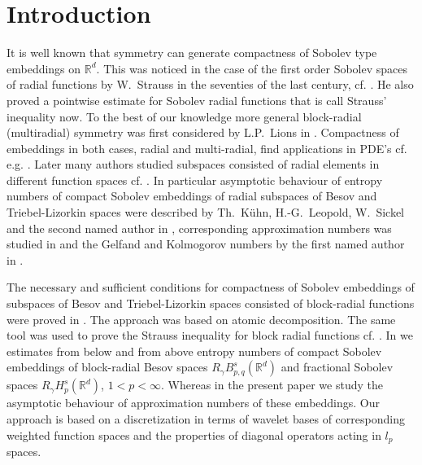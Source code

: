 \documentclass[12pt]{article}
\newcommand{\R}{{\mathbb R}}
\begin{document}
\section{Introduction}
 It is well known that symmetry  can generate compactness of Sobolev type embeddings on $\R^d$.    This  was noticed  in the case of the  first order Sobolev spaces of radial functions by W.~Strauss in  the seventies of the last century, cf. \cite{Strauss}. He also  proved  a pointwise estimate for  Sobolev radial functions that is call  Strauss' inequality now.  To the best of our knowledge  more general block-radial (multiradial) symmetry was first considered by L.P.~Lions in \cite{Lio82}. Compactness of embeddings in  both cases, radial and multi-radial, find applications in PDE's cf. e.g.   \cite{APS,Ku,PK,Serra}. 
  Later  many authors studied subspaces consisted of radial elements in different function spaces cf. \cite{EF1, SS1, SSV, SYY}. In particular asymptotic behaviour of entropy numbers of compact Sobolev embeddings of radial subspaces of Besov and Triebel-Lizorkin spaces were described  by {Th.~K{\"u}hn}, {H.-G.~Leopold, W.~Sickel} and the second named author in \cite{KLSS}, corresponding approximation numbers  was studied in \cite{ST} and the  Gelfand and Kolmogorov numbers by the first named author in \cite{AG}.    
 
 
  The necessary and sufficient conditions for compactness of Sobolev embeddings of subspaces of Besov and Triebel-Lizorkin spaces consisted of block-radial functions were proved in \cite{LS}. The approach was based on atomic decomposition. The same tool was used to prove the Strauss inequality for block radial functions cf. \cite{STi}.  In \cite{DS} we estimates from below and from above entropy numbers of compact Sobolev embeddings of block-radial   Besov spaces  $R_\gamma B^{s}_{p,q}(\R^d)$   and fractional  Sobolev spaces $R_\gamma H^{s}_{p}(\R^d)$, $1<p<\infty$. Whereas in the present paper we study the asymptotic behaviour of  approximation numbers of these embeddings.  Our approach is based on a discretization in terms of wavelet bases of corresponding weighted function spaces and the properties of  diagonal operators acting in $l_p$ spaces. 
     
\end{document}
